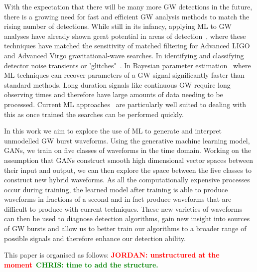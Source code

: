 \documentclass[12pt]{iopart}
\newcommand{\jordan}[1]{\textbf{\textcolor{red}{JORDAN: #1}}}
\newcommand{\chris}[1]{\textbf{\textcolor{green}{CHRIS: #1}}}
\begin{document}
%
With the expectation that there will be many more \ac{GW} detections in the
future, there is a growing need for fast and efficient \ac{GW} analysis methods
to match the rising number of detections. While still in its infancy, applying \ac{ML} to \ac{GW} analyses have already shown great potential in
areas of detection~\cite{Gabbard2017,Gebhard_2019,Krastev_2020}, where these techniques have matched the sensitivity of matched filtering for Advanced LIGO and Advanced Virgo gravitational-wave searches. In identifying and classifying detector noise transients or  'glitches"~\cite{Bahaadini, George_2018,Razzano_2018, 2020arXiv200801262G}. In Bayesian parameter
estimation~\cite{gabbard2019bayesian,
green2020gravitationalwave} where \ac{ML} techniques can recover parameters of a \ac{GW} signal significantly faster than standard methods. Long duration signals like continuous \ac{GW} require long observing times and therefore have large amounts of data needing to be processed. Current \ac{ML} approaches~\cite{2020PhRvD.102b2005D, 2019PhRvD.100d4009D, 2020arXiv200708207B} are particularly well suited to dealing with this as once trained the searches can be performed quickly.

%
In this work we aim to explore the use of \ac{ML} to generate and interpret
unmodelled \ac{GW} burst waveforms. Using the generative machine learning
model, \acp{GAN}, we train on five classes of waveforms in the time domain. Working on the assumption that \acp{GAN} construct smooth
 high dimensional vector spaces between their input and output, we can then
explore the space between the five classes to construct new
hybrid waveforms. As all the computationally expensive
processes occur during training, the learned model after training is able to
produce waveforms in fractions of a second and in fact produce waveforms that
are difficult to produce with current
techniques. These new varieties of waveforms can then be used to diagnose
detection algorithms, gain new insight into sources of \ac{GW}
bursts and  allow us to better train our algorithms to a
broader range of possible signals and therefore enhance our detection ability. 

%
This paper is organised as follows: \jordan{unstructured at the
moment}~\chris{time to add the structure.}

\end{document}
